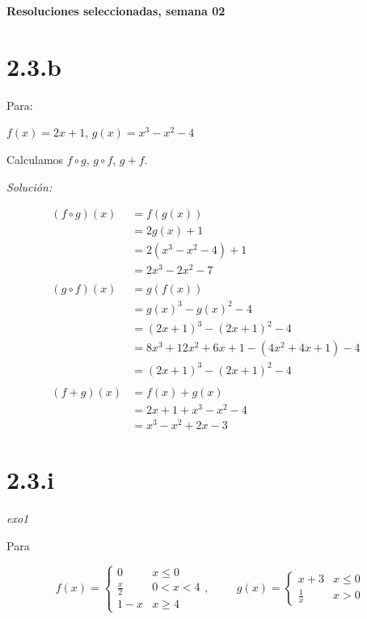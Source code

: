 \documentclass[10pt,a4paper]{article}
\renewcommand{\o}{\circ}
\begin{document}
\vspace{0,3cm}

\begin{center}
{\bf \Large Resoluciones seleccionadas, semana 02}
\end{center}

\vspace{0,3cm}

\section*{2.3.b}


\noindent
Para:

$ f(x) = 2x + 1$, \hspace{2cm} $g(x) = x^{3} - x^{2} - 4 $

\noindent
Calculamos $f \o g$, $g \o f$, $g + f$.


\noindent
\emph{Solución:}

\begin{align*}
  (f \o g)(x)
  &= f(g (x)) &\\
  &= 2g(x)+1 &\\
  &= 2 (x^3-x^2-4)+1 &\\
  &= 2x^3-2x^2-7 &\\ \\
  (g \o f)(x)
  &= g (f (x)) &\\
  &= g(x)^3-g(x)^2-4 &\\
  &= (2x+1)^3-(2x+1)^2-4 &\\
  &= 8 x^3 + 12 x^2 + 6 x + 1 - (4 x^2 + 4 x + 1) - 4 &\\
  &= (2x+1)^3-(2x+1)^2-4 & \\ \\
  (f + g) (x)
  &= f(x) + g (x) &\\
  &= 2x + 1 + x^3 - x^2 - 4 &\\
  &= x^3 - x^2 + 2x -3&
\end{align*}




\section*{2.3.i}\emph{exo1}


\noindent
Para

$$f(x) = \left \{ \begin{matrix} 0 & x \leq 0
\\ \frac{x}{2} & 0 < x < 4 
\\ 1- x & x \geq 4 \end{matrix}\right. , \hspace{1cm}
g(x) = \left \{ \begin{matrix} x +3 & x \leq 0
\\  \frac{1}{x} & x > 0 \end{matrix}\right.$$
\end{document}
